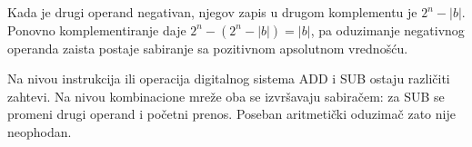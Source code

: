 Kada je drugi operand negativan, njegov zapis u drugom komplementu je $2^n-|b|$. Ponovno komplementiranje daje $2^n-(2^n-|b|)=|b|$, pa oduzimanje negativnog operanda zaista postaje sabiranje sa pozitivnom apsolutnom vrednošću.

Na nivou instrukcija ili operacija digitalnog sistema ADD i SUB ostaju različiti zahtevi. Na nivou kombinacione mreže oba se izvršavaju sabiračem: za SUB se promeni drugi operand i početni prenos. Poseban aritmetički oduzimač zato nije neophodan.
